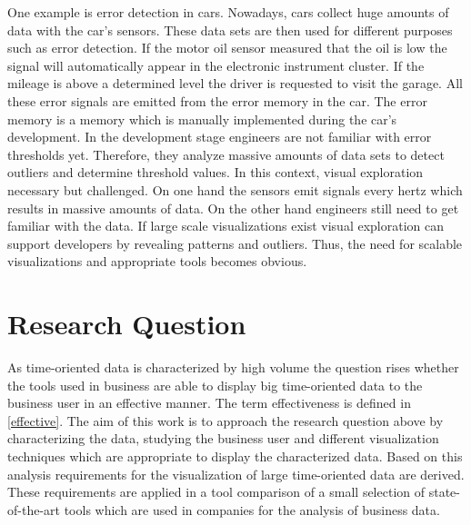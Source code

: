 \par 
One example is error detection in cars. Nowadays, cars collect huge amounts of data with the car's sensors. These data sets are then used for different purposes such as error detection. If the motor oil sensor measured that the oil is low the signal will automatically appear in the electronic instrument cluster. If the mileage is above a determined level the driver is requested to visit the garage. All these error signals are emitted from the error memory in the car. The error memory is a memory which is manually implemented during the car's development. In the development stage engineers are not familiar with error thresholds yet. Therefore, they analyze massive amounts of data sets to detect outliers and determine threshold values. In this context, visual exploration  necessary but challenged. On one hand the sensors emit signals every hertz which results in massive amounts of data. On the other hand engineers still need to get familiar with the data. If large scale visualizations exist visual exploration can support developers by revealing patterns and outliers. Thus, the need for scalable visualizations and appropriate tools becomes obvious. 


\section{Research Question}
As time-oriented data is characterized by high volume the question rises whether the tools used in business are able to display big time-oriented data to the business user in an effective manner. The term effectiveness is defined in \ref{effective}. The aim of this work is to approach the research question above by characterizing the data, studying the business user and different visualization techniques which are appropriate to display the characterized data. Based on this analysis requirements for the visualization of large time-oriented data are derived. These requirements are applied in a tool comparison of a small selection of state-of-the-art tools which are used in companies for the analysis of business data.


